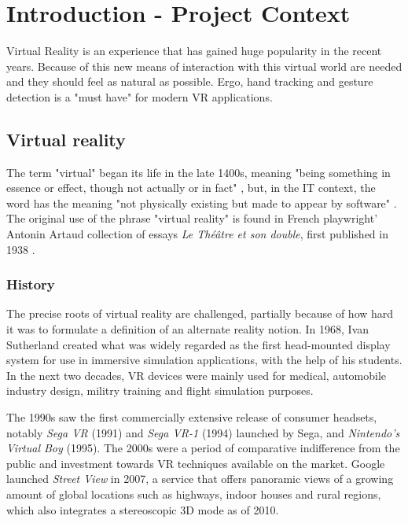 \documentclass[12pt,a4paper,twoside]{report}
\begin{document}
\tableofcontents
\newpage

\setcounter{page}{1}


\chapter{Introduction - Project Context}
\pagestyle{headings}

Virtual Reality is an experience that has gained huge popularity in the recent years. Because of this new means of interaction with this virtual world are needed and they should feel as natural as possible. Ergo, hand tracking and gesture detection is a "must have" for modern VR applications.

\section{Virtual reality}
The term "virtual" began its life in the late 1400s, meaning "being something in essence or effect, though not actually or in fact" \cite{Virtual}, but, in the IT context, the word has the meaning "not physically existing but made to appear by software" \cite{Virtual}. The original use of the phrase "virtual reality" is found in French playwright' Antonin Artaud collection of essays \textit{Le Théâtre et son double}, first published in 1938 \cite{TheatreAndItsDouble}.

\subsection{History}
The precise roots of virtual reality are challenged, partially because of how hard it was to formulate a definition of an alternate reality notion. In 1968, Ivan Sutherland created what was widely regarded as the first head-mounted display system for use in immersive simulation applications, with the help of his students. In the next two decades, VR devices were mainly used for medical, automobile industry design, militry training and flight simulation purposes.

The 1990s saw the first commercially extensive release of consumer headsets, notably \textit{Sega VR} (1991) and \textit{Sega VR-1} (1994) launched by Sega, and \textit{Nintendo's Virtual Boy} (1995). The 2000s were a period of comparative indifference from the public and investment towards VR techniques available on the market. Google launched \textit{Street View} in 2007, a service that offers panoramic views of a growing amount of global locations such as highways, indoor houses and rural regions, which also integrates a stereoscopic 3D mode as of 2010.
\end{document}
